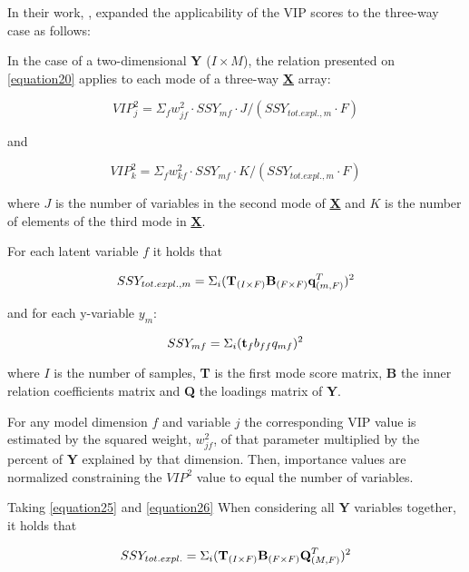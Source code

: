 In their work, \textcite{favilla2013assessing}, expanded the applicability of the VIP scores to the three-way case as follows:

In the case of a two-dimensional \textbf{Y} ($I \times M$), the relation presented on \autoref{equation20} applies to each mode of a three-way \textbf{\underline{X}} array:

\begin{equation}
VIP^2_j=\Sigma_fw^2_{jf} \cdot SSY_{mf} \cdot J/(SSY_{tot.expl.,m} \cdot F)
\label{equation23}
\end{equation}

and

\begin{equation}
VIP^2_k=\Sigma_fw^2_{kf} \cdot SSY_{mf} \cdot K/(SSY_{tot.expl.,m} \cdot F)
\label{equation24}
\end{equation}

where $J$ is the number of variables in the second mode of \textbf{\underline{X}} and $K$ is the number of elements of the third mode in \textbf{\underline{X}}.

For each latent variable $f$ it holds that

\begin{equation}
SSY_{tot.expl.,m}=\Sigma_i(\textbf{\text{T}}_{(I \times F)}\textbf{\text{B}}_{(F \times F)}\textbf{\text{q}}^T_{(m, F)})^2
\label{equation25}
\end{equation}

and for each y-variable $y_m$:

\begin{equation}
SSY_{mf}=\Sigma_i(\textbf{\text{t}}_fb_{ff}q_{mf})^2
\label{equation26}
\end{equation}

where $I$ is the number of samples, \textbf{T} is the first mode score matrix, \textbf{B} the inner relation coefficients matrix and \textbf{Q} the loadings matrix of \textbf{Y}.

For any model dimension $f$ and variable $j$ the corresponding VIP value is estimated by the squared weight, $w_{jf}^2$, of that parameter multiplied by the percent of \textbf{Y} explained by that dimension. Then, importance values are normalized constraining the $VIP^2$ value to equal the number of variables.

Taking \autoref{equation25} and \autoref{equation26} When considering all \textbf{Y} variables together, it holds that

\begin{equation}
SSY_{tot.expl.}=\Sigma_i(\textbf{\text{T}}_{(I \times F)}\textbf{\text{B}}_{(F \times F)}\textbf{\text{Q}}^T_{(M, F)})^2
\label{equation27}
\end{equation}

